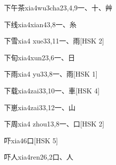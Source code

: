 \begin{EntryWithPhonetic}{下午茶}{xia4wu3cha2}{3,4,9}{⼀、⼗、⾋}
\end{EntryWithPhonetic}

\begin{EntryWithPhonetic}{下线}{xia4xian4}{3,8}{⼀、⽷}
\end{EntryWithPhonetic}

\begin{EntryWithPhonetic}{下雪}{xia4 xue3}{3,11}{⼀、⾬}[HSK 2]
\end{EntryWithPhonetic}

\begin{EntryWithPhonetic}{下旬}{xia4xun2}{3,6}{⼀、⽇}
\end{EntryWithPhonetic}

\begin{EntryWithPhonetic}{下雨}{xia4 yu3}{3,8}{⼀、⾬}[HSK 1]
\end{EntryWithPhonetic}

\begin{EntryWithPhonetic}{下载}{xia4zai3}{3,10}{⼀、⾞}[HSK 4]
\end{EntryWithPhonetic}

\begin{EntryWithPhonetic}{下崽}{xia4zai3}{3,12}{⼀、⼭}
\end{EntryWithPhonetic}

\begin{EntryWithPhonetic}{下周}{xia4 zhou1}{3,8}{⼀、⼝}[HSK 2]
\end{EntryWithPhonetic}

\begin{EntryWithPhonetic}{吓}{xia4}{6}{⼝}[HSK 5]
\end{EntryWithPhonetic}

\begin{EntryWithPhonetic}{吓人}{xia4ren2}{6,2}{⼝、⼈}
\end{EntryWithPhonetic}

